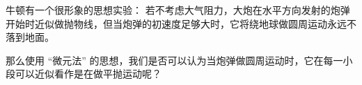
牛顿有一个很形象的思想实验： 若不考虑大气阻力，大炮在水平方向发射的炮弹开始时近似做抛物线，但当炮弹的初速度足够大时，它将绕地球做圆周运动永远不落到地面。

那么使用 “微元法” 的思想，我们是否可以认为当炮弹做圆周运动时，它在每一小段可以近似看作是在做平抛运动呢？
